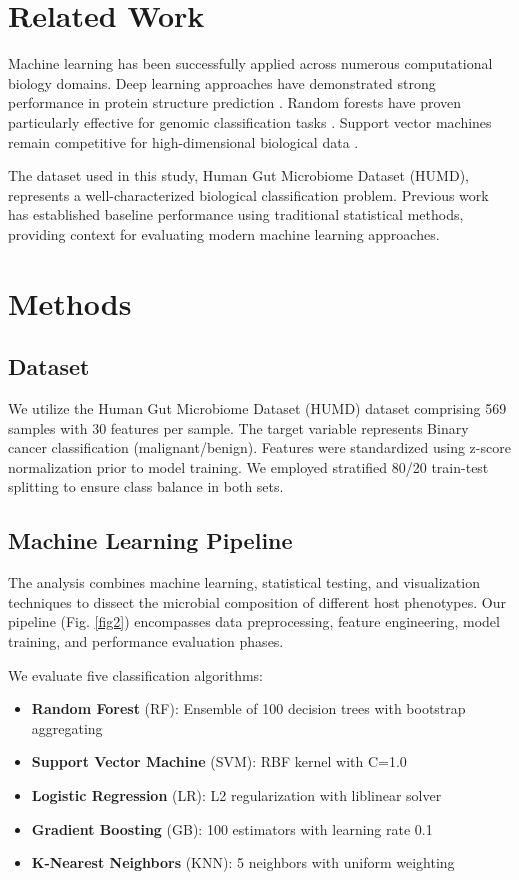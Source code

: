 \documentclass[conference]{IEEEtran}
\begin{document}
\section{Related Work}

Machine learning has been successfully applied across numerous computational biology domains.
Deep learning approaches have demonstrated strong performance in protein structure prediction \cite{jumper2021highly}.
Random forests have proven particularly effective for genomic classification tasks \cite{breiman2001random}.
Support vector machines remain competitive for high-dimensional biological data \cite{scholkopf2002learning}.

The dataset used in this study, Human Gut Microbiome Dataset (HUMD), represents a well-characterized
biological classification problem. Previous work has established baseline performance using
traditional statistical methods, providing context for evaluating modern machine learning approaches.

\section{Methods}

\subsection{Dataset}

We utilize the Human Gut Microbiome Dataset (HUMD) dataset comprising 569 samples
with 30 features per sample. The target variable represents Binary cancer classification (malignant/benign).
Features were standardized using z-score normalization prior to model training.
We employed stratified 80/20 train-test splitting to ensure class balance in both sets.

\subsection{Machine Learning Pipeline}

The analysis combines machine learning, statistical testing, and visualization techniques to dissect the microbial composition of different host phenotypes.
Our pipeline (Fig. \ref{fig2}) encompasses data preprocessing, feature engineering,
model training, and performance evaluation phases.

We evaluate five classification algorithms:
\begin{itemize}
\item \textbf{Random Forest} (RF): Ensemble of 100 decision trees with bootstrap aggregating
\item \textbf{Support Vector Machine} (SVM): RBF kernel with C=1.0
\item \textbf{Logistic Regression} (LR): L2 regularization with liblinear solver
\item \textbf{Gradient Boosting} (GB): 100 estimators with learning rate 0.1
\item \textbf{K-Nearest Neighbors} (KNN): 5 neighbors with uniform weighting
\end{itemize}
\end{document}

